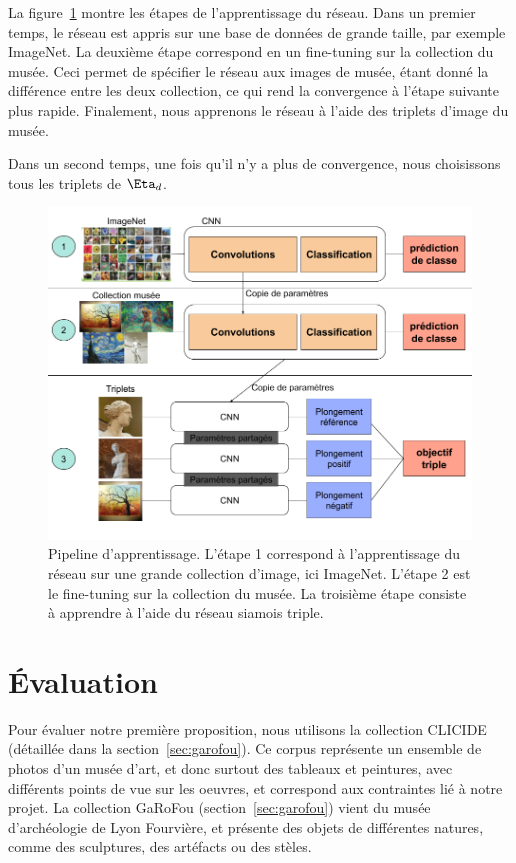 La figure~\ref{fig:pipelinesimilarite} montre les étapes de l'apprentissage du réseau.
Dans un premier temps, le réseau est appris sur une base de données de grande taille, par exemple ImageNet.
La deuxième étape correspond en un fine-tuning sur la collection du musée.
Ceci permet de spécifier le réseau aux images de musée, étant donné la différence entre les deux collection, ce qui rend la convergence à l'étape suivante plus rapide.
Finalement, nous apprenons le réseau à l'aide des triplets d'image du musée.


Dans un second temps, une fois qu'il n'y a plus de convergence, nous choisissons tous les triplets de $\Eta_d$.

\begin{figure}[htbp]
\includegraphics[width=\columnwidth]{figures/pipeline1.png}%
\caption{Pipeline d'apprentissage. L'étape 1 correspond à l'apprentissage du réseau sur une grande collection d'image, ici ImageNet. L'étape 2 est le fine-tuning sur la collection du musée. La troisième étape consiste à apprendre à l'aide du réseau siamois triple.}%
\label{fig:pipelinesimilarite}%
\end{figure}



\section{Évaluation}

Pour évaluer notre première proposition, nous utilisons la collection CLICIDE (détaillée dans la section~\ref{sec:garofou}). 
Ce corpus représente un ensemble de photos d'un musée d'art, et donc surtout des tableaux et peintures, avec différents points de vue sur les oeuvres, et correspond aux contraintes lié à notre projet. La collection GaRoFou (section~\ref{sec:garofou}) vient du musée d'archéologie de Lyon Fourvière, et présente des objets de différentes natures, comme des sculptures, des artéfacts ou des stèles.

